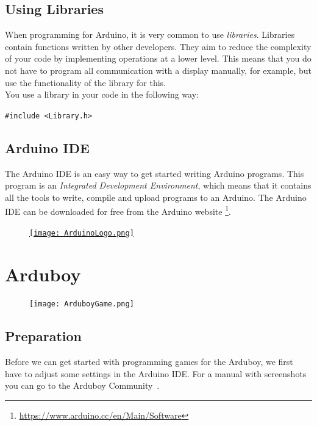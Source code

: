\documentclass[11pt,fleqn]{book} %
\begin{document}
\section{Using Libraries}
When programming for Arduino, it is very common to use \emph{libraries}. Libraries contain functions written by other developers. They aim to reduce the complexity of your code by implementing operations at a lower level. This means that you do not have to program all communication with a display manually, for example, but use the functionality of the library for this.\\

\noindent
You use a library in your code in the following way:
\begin{center}
	\texttt{#include <Library.h>}
\end{center}

\section{Arduino IDE}
The Arduino IDE is an easy way to get started writing Arduino programs. This program is an \emph {Integrated Development Environment}, which means that it contains all the tools to write, compile and upload programs to an Arduino. The Arduino IDE can be downloaded for free from the Arduino website \footnote{\url{https://www.arduino.cc/en/Main/Software}}.

\begin{figure}[!h]
	\centering
	\href{https://www.arduino.cc/en/Main/Software}{
		\texttt{[image: ArduinoLogo.png]}
	}
\end{figure}

\chapter{Arduboy}
\begin{figure}[!h]
	\centering
	\texttt{[image: ArduboyGame.png]}
\end{figure}

\section{Preparation}
\label{sec:arduboy-instellingen}

Before we can get started with programming games for the Arduboy, we first have to adjust some settings in the Arduino IDE. For a manual with screenshots you can go to the Arduboy Community~\cite{arduboy:tuto1}.
\end{document}
